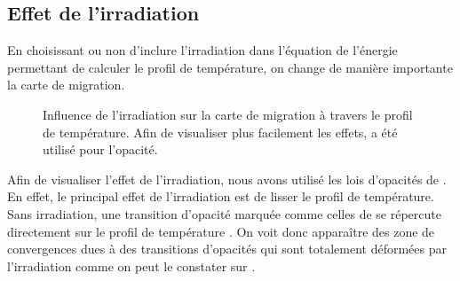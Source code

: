 \subsection{Effet de l'irradiation}
En choisissant ou non d'inclure l'irradiation dans l'équation de l'énergie permettant de calculer le profil de température, on
change de manière importante la carte de migration. 


\begin{figure}[htb]
\centering
{}\hfill
{}

\caption{Influence de l'irradiation sur la carte de migration à travers le profil de température. Afin de visualiser plus
facilement les effets, \cite{bell1994FU} a été utilisé pour l'opacité.}\label{fig:irradiation}
\end{figure}

Afin de visualiser l'effet de l'irradiation, nous avons utilisé les lois d'opacités de \cite{bell1994FU}. En effet,
le principal effet de l'irradiation est de lisser le profil de température. Sans irradiation, une transition d'opacité marquée
comme celles de \cite{bell1994FU} se répercute directement sur le profil de température .
On voit donc apparaître des zone de convergences dues à des transitions d'opacités qui sont totalement déformées par
l'irradiation comme on peut le constater sur .

